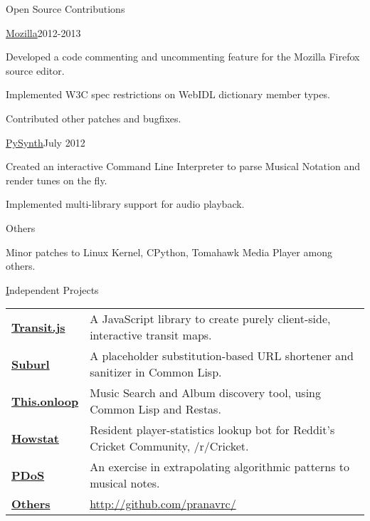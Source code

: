 \documentclass{gradresume} %
\begin{document}
\begin{rSection}{Open Source Contributions}

\begin{rSubsection}{\href{https://bugzilla.mozilla.org/user\%5Fprofile?user\%5Fid=431664}{Mozilla}}{2012-2013}{}{}
\item Developed a code commenting and uncommenting feature for the Mozilla Firefox source editor.
\item Implemented W3C spec restrictions on WebIDL dictionary member types.
\item Contributed other patches and bugfixes.
\end{rSubsection}

\begin{rSubsection}{\href{https://github.com/mdoege/PySynth/commits?author=pranavrc}{PySynth}}{July 2012}{}{}
\item Created an interactive Command Line Interpreter to parse Musical Notation and render tunes on the fly.
\item Implemented multi-library support for audio playback.
\end{rSubsection}

\begin{rSubsection}{Others}{}{}{}
\item Minor patches to Linux Kernel, CPython, Tomahawk Media Player among others.
\end{rSubsection}

\end{rSection}


\begin{rSection}{{\href{http://github.com/pranavrc/}Independent Projects}}

\begin{tabular}{ @{} >{\bfseries}l @{\hspace{6ex}} l }
\href{http://onloop.net/transit/}{Transit.js} & A JavaScript library to create purely client-side, interactive transit maps. \\
\href{http://u.onloop.net/}{Suburl} & A placeholder substitution-based URL shortener and sanitizer in Common Lisp. \\
\href{http://this.onloop.net/}{This.onloop} & Music Search and Album discovery tool, using Common Lisp and Restas. \\
\href{http://redd.it/1i7lh3}{Howstat} & Resident player-statistics lookup bot for Reddit's Cricket Community, /r/Cricket. \\
\href{http://music.onloop.net}{PDoS} & An exercise in extrapolating algorithmic patterns to musical notes. \\
\href{http://github.com/pranavrc/}{Others} & \href{http://github.com/pranavrc/}{http://github.com/pranavrc/}
\end{tabular}

\end{rSection}
\end{document}
